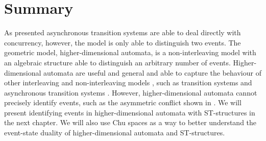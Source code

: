 \section{Summary}

As presented asynchronous transition systems are able to deal directly with concurrency, however, the model is only able to distinguish two events. The geometric model, higher-dimensional automata, is a non-interleaving model with an algebraic structure able to distinguish an arbitrary number of events. Higher-dimensional automata are useful and general and able to capture the behaviour of other interleaving and non-interleaving models \cite{Goubault18RelationshipsModelsForConcurrency}, such as transition systems and asynchronous transition systems \cite{Fajstrup16DirectedAlgebraicTopologyConcurrency}. However, higher-dimensional automata cannot precisely identify events, such as the asymmetric conflict shown in \cite[Figure 5]{Johansen16STstruct}. We will present identifying events in higher-dimensional automata with ST-structures in the next chapter. We will also use Chu spaces as a way to better understand the event-state duality of higher-dimensional automata and ST-structures.
